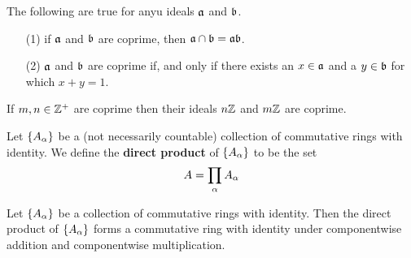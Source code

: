 \begin{lemma}\label{1.6.4}
    The following are true for anyu ideals $\af$ and  $\bf$.
    \begin{enumerate}
        \item[(1)] if $\af$ and $\bf$ are coprime, then $\af \cap \bf=\af\bf$.

        \item[(2)] $\af$ and  $\bf$ are coprime if, and only if there exists an
            $x \in \af$ and a $y \in \bf$ for which $x+y=1$.
    \end{enumerate}
\end{lemma}
\begin{corollary}
    If $m,n \in \Z^+$ are coprime then their ideals $n\Z$ and $m\Z$ are coprime.
\end{corollary}

\begin{definition}
    Let $\{A_\a\}$ be a (not necessarily countable) collection of commutative
    rings with identity. We define the \textbf{direct product} of $\{A_\a\}$ to
    be the set
    \begin{equation*}
        A=\prod_{\a}{A_\a}
    \end{equation*}
\end{definition}

\begin{lemma}\label{1.6.5}
    Let $\{A_\a\}$ be a collection of commutative rings with identity. Then the
    direct product of $\{A_\a\}$ forms a commutative ring with identity under
    componentwise addition and componentwise multiplication.
\end{lemma}

